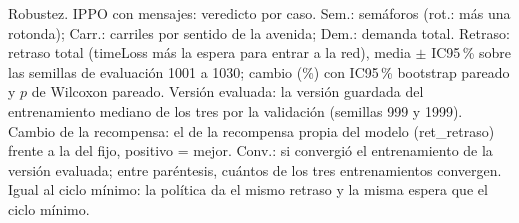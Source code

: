 \begin{table}[H]
\caption[Robustez: veredicto de IPPO con mensajes]{Robustez. IPPO con mensajes: veredicto por caso. Sem.: semáforos (rot.: más una rotonda); Carr.: carriles por sentido de la avenida; Dem.: demanda total. Retraso: retraso total (timeLoss más la espera para entrar a la red), media $\pm$ IC95\,\% sobre las semillas de evaluación 1001 a 1030; cambio (\%) con IC95\,\% bootstrap pareado y $p$ de Wilcoxon pareado. Versión evaluada: la versión guardada del entrenamiento mediano de los tres por la validación (semillas 999 y 1999). Cambio de la recompensa: el de la recompensa propia del modelo (ret\_retraso) frente a la del fijo, positivo = mejor. Conv.: si convergió el entrenamiento de la versión evaluada; entre paréntesis, cuántos de los tres entrenamientos convergen. Igual al ciclo mínimo: la política da el mismo retraso y la misma espera que el ciclo mínimo.}
\label{tab:robustez-veredicto-ippo-vecinos}
\end{table}
